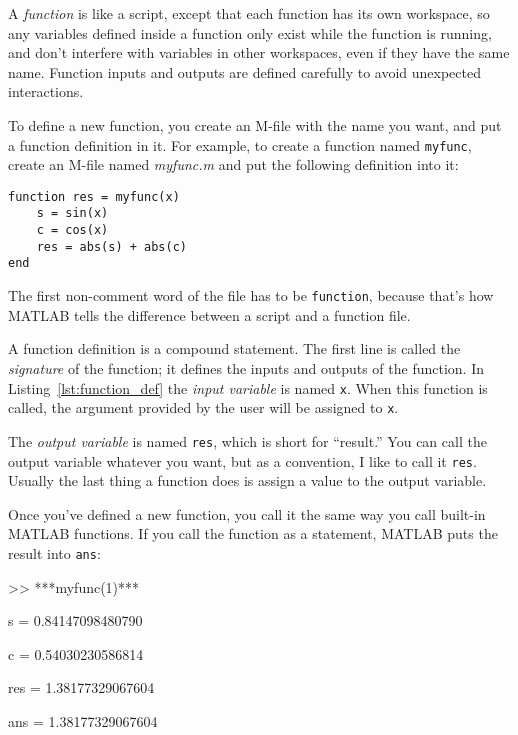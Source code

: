 A {\em function} is like a script, except that each function has its own workspace, so any variables defined
inside a function only exist while the function is running, and don't
interfere with variables in other workspaces, even if they have the
same name. 
Function inputs and outputs are defined carefully to avoid
unexpected interactions.

To define a new function, you create an M-file with the name you
want, and put a function definition in it.  For example, to create
a function named {\tt myfunc}, create an M-file named {\em myfunc.m}
and put the following definition into it:


\begin{lstlisting}[caption={A function definition}, label={lst:function_def}]
function res = myfunc(x)
    s = sin(x)
    c = cos(x)
    res = abs(s) + abs(c)
end
\end{lstlisting}

The first non-comment word of the file has to be \lstinline{function}, because
that's how MATLAB tells the difference between a script and a function
file.


A function definition is a compound statement.  The first line
is called the {\em signature} of the function; it defines
the inputs and outputs of the function.  In Listing~\ref{lst:function_def} the {\em input variable} is named \lstinline{x}.  When this function is called, the
argument provided by the user will be assigned to \lstinline{x}.



The {\em output variable} is named \lstinline{res}, which is short for
``result.''  You can call the output variable whatever you want, but
as a convention, I like to call it \lstinline{res}.  Usually the last
thing a function does is assign a value to the output variable.


Once you've defined a new function, you call it the same way you
call built-in MATLAB functions.  If you call the function as a statement,
MATLAB puts the result into \lstinline{ans}:

\begin{code}
>> ***myfunc(1)***

s = 0.84147098480790

c = 0.54030230586814

res = 1.38177329067604

ans = 1.38177329067604
\end{code}

